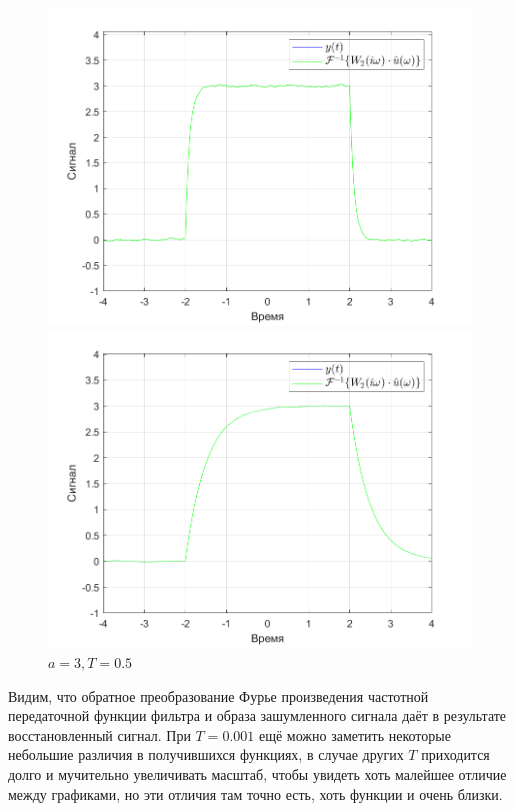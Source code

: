 \documentclass[a4paper]{article}
\begin{document}
\begin{figure}[H]
    \begin{minipage}{0.5\textwidth}
        \centering
        \includegraphics[width=\linewidth]{ex1_1/a=3_T=0.1/h2.png}
        \caption{$a = 3, T = 0.1$}
    \end{minipage}
    \begin{minipage}{0.5\textwidth}
        \centering
        \includegraphics[width=\linewidth]{ex1_1/a=3_T=0.5/h2.png}
        \caption{$a = 3, T = 0.5$}
    \end{minipage}
\end{figure}

Видим, что обратное преобразование Фурье произведения частотной передаточной функции фильтра и образа зашумленного сигнала даёт в результате восстановленный сигнал. При $T = 0.001$ ещё можно заметить некоторые небольшие различия в получившихся функциях, в случае других $T$ приходится долго и мучительно увеличивать масштаб, чтобы увидеть хоть малейшее отличие между графиками, но эти отличия там точно есть, хоть функции и очень близки.\ 
\end{document}
